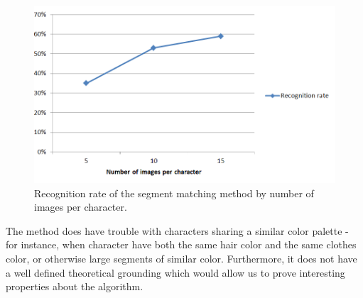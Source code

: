 \begin{figure}[htb!]
\includegraphics[width=\textwidth]{images/recognitionRate.png}
\caption{Recognition rate of the segment matching method by number of images per character.}
\label{fig:recognitionRates}
\end{figure}

The method does have trouble with characters sharing a similar color palette - for instance, when character have both the same hair color and the same clothes color, or otherwise large segments of similar color. Furthermore, it does not have a well defined theoretical grounding which would allow us to prove interesting properties about the algorithm.
